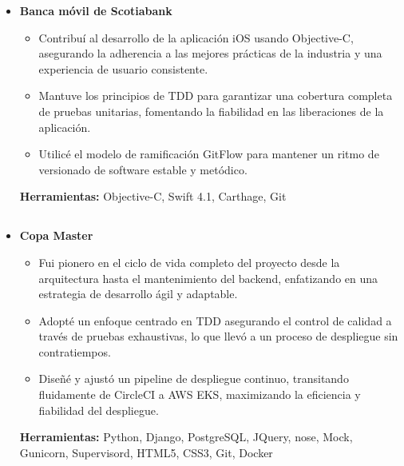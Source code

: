 \documentclass[11pt,a4paper,english]{moderncv}
\begin{document}
{\begin{itemize}
\begin{itemize}
            \item Innové un robusto pipeline de despliegue continuo utilizando CircleCI y AWS EKS para agilizar la entrega de software.
            \item Mejoré el rendimiento descargando tareas computacionalmente intensivas a trabajos de Celery, optimizando operaciones asíncronas.
            \item Desarrollé un sistema automatizado de moderación de contenido utilizando AWS Rekognition y Azure Cognitive Services que mantuvo la calidad y el cumplimiento del contenido.
        \end{itemize}
        \textbf{Herramientas:} Python, asyncio, Flask, SQLAlchemy, MySQL, MongoDB, Mock, Git, Docker
    \item \textbf{Banca móvil de Scotiabank}
        \begin{itemize}
            \item Contribuí al desarrollo de la aplicación iOS usando Objective-C, asegurando la adherencia a las mejores prácticas de la industria y una experiencia de usuario consistente.
            \item Mantuve los principios de TDD para garantizar una cobertura completa de pruebas unitarias, fomentando la fiabilidad en las liberaciones de la aplicación.
            \item Utilicé el modelo de ramificación GitFlow para mantener un ritmo de versionado de software estable y metódico.
        \end{itemize}
        \textbf{Herramientas:} Objective-C, Swift 4.1, Carthage, Git
\end{itemize}
}

\subsection{}

{
    \begin{itemize}
        \item \textbf{Copa Master}
            \begin{itemize}
                \item Fui pionero en el ciclo de vida completo del proyecto desde la arquitectura hasta el mantenimiento del backend, enfatizando en una estrategia de desarrollo ágil y adaptable.
                \item Adopté un enfoque centrado en TDD asegurando el control de calidad a través de pruebas exhaustivas, lo que llevó a un proceso de despliegue sin contratiempos.
                \item Diseñé y ajustó un pipeline de despliegue continuo, transitando fluidamente de CircleCI a AWS EKS, maximizando la eficiencia y fiabilidad del despliegue.
            \end{itemize}
            \textbf{Herramientas:} Python, Django, PostgreSQL, JQuery, nose, Mock, Gunicorn, Supervisord, HTML5, CSS3, Git, Docker
    \end{itemize}
}
\end{document}
